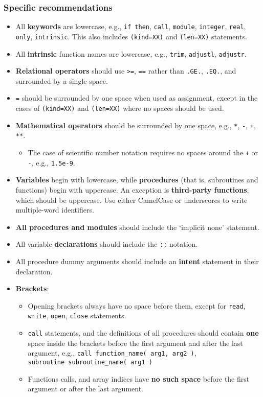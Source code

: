 \subsubsection{Specific recommendations} \label{specific-recommendations}

\begin{itemize}
\item All \textbf{keywords} are lowercase, e.g., \texttt{if\ then},
  \texttt{call}, \texttt{module}, \texttt{integer}, \texttt{real},
  \texttt{only}, \texttt{intrinsic}. This also includes
  \texttt{(kind=XX)} and \texttt{(len=XX)} statements.
\item All \textbf{intrinsic} function names are lowercase, e.g.,
  \texttt{trim}, \texttt{adjustl}, \texttt{adjustr}.
\item \textbf{Relational operators} should use
  \texttt{\textgreater{}=}, \texttt{==} rather than \texttt{.GE.},
  \texttt{.EQ.}, and surrounded by a single space.
\item \texttt{=} should be surrounded by one space when used as
  assignment, except in the cases of \texttt{(kind=XX)} and
  \texttt{(len=XX)} where no spaces should be used.
\item \textbf{Mathematical operators} should be surrounded by one
  space, e.g., \texttt{*}, \texttt{-}, \texttt{+}, \texttt{**}.
  \begin{itemize}
  \item The case of scientific number notation requires no spaces
    around the \texttt{+} or \texttt{-}, e.g., \texttt{1.5e-9}.
  \end{itemize}
\item \textbf{Variables} begin with lowercase, while
  \textbf{procedures} (that is, subroutines and functions) begin with
  uppercase. An exception is \textbf{third-party functions}, which
  should be uppercase. Use either CamelCase or underscores to write
  multiple-word identifiers.
\item \textbf{All procedures and modules} should include the `implicit
  none' statement.
\item All variable \textbf{declarations} should include the
  \texttt{::} notation.
\item All procedure dummy arguments should include an \textbf{intent}
  statement in their declaration.
\item \textbf{Brackets}:
  \begin{itemize}
  \item Opening brackets always have no space before them, except for
    \texttt{read}, \texttt{write}, \texttt{open}, \texttt{close}
    statements.
  \item \texttt{call} statements, and the definitions of all
    procedures should contain \textbf{one} space inside the brackets
    before the first argument and after the last argument, e.g.,
    \texttt{call\ function\_name(\ arg1,\ arg2\ )},
    \texttt{subroutine\ subroutine\_name(\ arg1\ )}
  \item Functions calls, and array indices have \textbf{no such space}
    before the first argument or after the last argument.
  \end{itemize}
\end{itemize}
